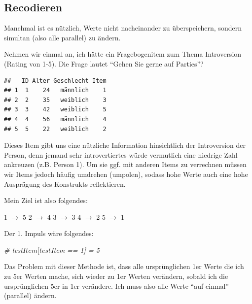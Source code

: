 \documentclass[
]{book}
\newenvironment{Shaded}{\begin{snugshade}}{\end{snugshade}}
\newcommand{\CommentTok}[1]{\textcolor[rgb]{0.56,0.35,0.01}{\textit{#1}}}
\newcommand{\DecValTok}[1]{\textcolor[rgb]{0.00,0.00,0.81}{#1}}
\newcommand{\FunctionTok}[1]{\textcolor[rgb]{0.00,0.00,0.00}{#1}}
\newcommand{\NormalTok}[1]{#1}
\newcommand{\OtherTok}[1]{\textcolor[rgb]{0.56,0.35,0.01}{#1}}
\newcommand{\SpecialCharTok}[1]{\textcolor[rgb]{0.00,0.00,0.00}{#1}}
\begin{document}
\hypertarget{recodieren}{%
\subsection{Recodieren}\label{recodieren}}

Manchmal ist es nützlich, Werte nicht nacheinander zu überspeichern, sondern simultan (also alle parallel) zu ändern.

Nehmen wir einmal an, ich hätte ein Fragebogenitem zum Thema Introversion (Rating von 1-5). Die Frage lautet ``Gehen Sie gerne auf Parties''?

\begin{Shaded}
\end{Shaded}

\begin{verbatim}
##   ID Alter Geschlecht Item
## 1  1    24   männlich    1
## 2  2    35   weiblich    3
## 3  3    42   weiblich    5
## 4  4    56   männlich    4
## 5  5    22   weiblich    2
\end{verbatim}

Dieses Item gibt uns eine nützliche Information hinsichtlich der Introversion der Person, denn jemand sehr introvertiertes würde vermutlich eine niedrige Zahl ankreuzen (z.B. Person 1). Um sie ggf. mit anderen Items zu verrechnen müssen wir Items jedoch häufig umdrehen (umpolen), sodass hohe Werte auch eine hohe Ausprägung des Konstrukts reflektieren.

Mein Ziel ist also folgendes:

1 \(\rightarrow\) 5
2 \(\rightarrow\) 4
3 \(\rightarrow\) 3
4 \(\rightarrow\) 2
5 \(\rightarrow\) 1

Der 1. Impuls wäre folgendes:

\begin{Shaded}
\begin{Highlighting}[]
\CommentTok{\# test$Item[test$Item == 1] = 5}
\end{Highlighting}
\end{Shaded}

Das Problem mit dieser Methode ist, dass alle ursprünglichen 1er Werte die ich zu 5er Werten mache, sich wieder zu 1er Werten verändern, sobald ich die ursprünglichen 5er in 1er verändere. Ich muss also alle Werte ``auf einmal'' (parallel) ändern.
\end{document}
